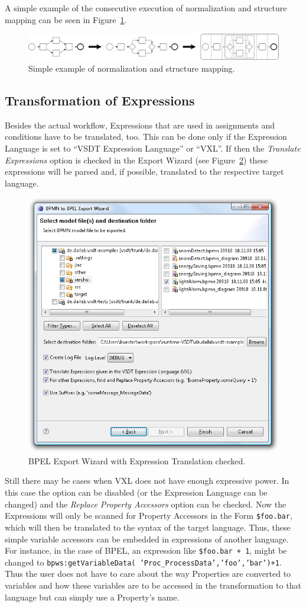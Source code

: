 A simple example of the consecutive execution of normalization and structure
mapping can be seen in Figure~\ref{fig:norm_struc}.

\begin{figure}[ht]
	\centering
	\includegraphics[width=\textwidth]{figures/trafo/norm_struc.pdf}
	\caption{Simple example of normalization and structure mapping.}
	\label{fig:norm_struc}
\end{figure}


\subsection{Transformation of Expressions}

Besides the actual workflow, Expressions that are used in assignments and
conditions have to be translated, too.  This can be done only if the Expression
Language is set to ``VSDT Expression Language'' or ``VXL''.  If then the
\emph{Translate Expressions} option is checked in the Export Wizard (see
Figure~\ref{fig:trafo_wiz}) these expressions will be parsed and, if possible,
translated to the respective target language.

\begin{figure}[ht]
	\centering
	\includegraphics[width=.5\textwidth]{figures/features/exportWiz.png}
	\caption{BPEL Export Wizard with Expression Translation checked.}
	\label{fig:trafo_wiz}
\end{figure}

Still there may be cases when VXL does not have enough expressive power.  In this
case the option can be disabled (or the Expression Language can be changed) and
the \emph{Replace Property Accessors} option can be checked.  Now the Expressions
will only be scanned for Property Accessors in the Form \texttt{\$foo.bar}, which
will then be translated to the syntax of the target language.  Thus, these simple
variable accessors can be embedded in expressions of another language.  For instance,
in the case of BPEL, an expression like \texttt{\$foo.bar + 1}, might be changed
to \texttt{bpws:getVariableData( 'Proc\_ProcessData','foo','bar')+1}.  Thus the
user does not have to care about the way Properties are converted to variables
and how these variables are to be accessed in the transformation to that language
but can simply use a Property's name.

